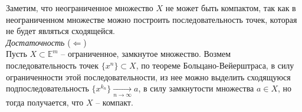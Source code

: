 \documentclass[a4paper,12pt]{article} %
\begin{document}
\noindent Заметим, что неограниченное множество $X$ не может быть компактом, так как в неограниченном множестве можно построить последовательность точек, которая не будет являться сходящейся.\\

\noindent \textit{Достаточность} ($\Leftarrow$)\\
\noindent Пусть $X \subset \mathbb{E}^m$ -- ограниченное, замкнутое множество. Возмем последовательность точек $\{x^n \} \subset X$, по теореме Больцано-Вейерштраса, в силу ограниченности этой последовательности, из нее можно выделить сходящуюся подпоследовательность $\{x^{k_n} \} \xrightarrow[n \to \infty]{} a$, в силу замкнутости множества $a \in X$, но тогда получается, что $X$ -- компакт.
\end{document}
